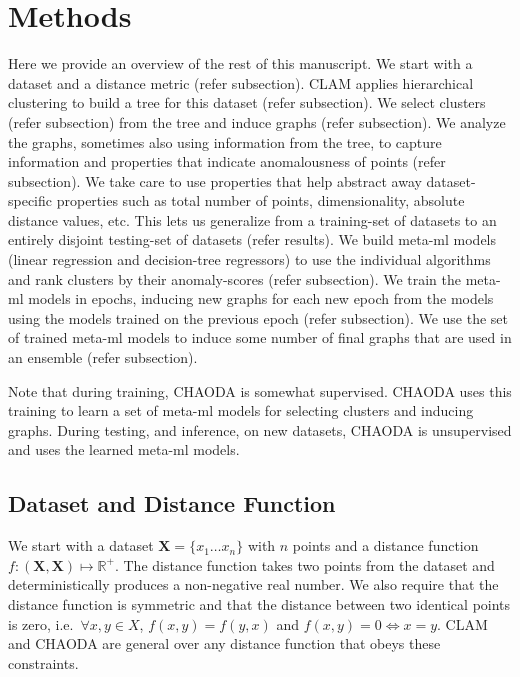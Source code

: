 \section{Methods}
\label{sec:methods}


Here we provide an overview of the rest of this manuscript.
We start with a dataset and a distance metric (refer subsection).
CLAM applies hierarchical clustering to build a tree for this dataset (refer subsection).
We select clusters (refer subsection) from the tree and induce graphs (refer subsection).
We analyze the graphs, sometimes also using information from the tree, to capture information and properties that indicate anomalousness of points (refer subsection).
We take care to use properties that help abstract away dataset-specific properties such as total number of points, dimensionality, absolute distance values, etc.
This lets us generalize from a training-set of datasets to an entirely disjoint testing-set of datasets (refer results).
We build meta-ml models (linear regression and decision-tree regressors) to use the individual algorithms and rank clusters by their anomaly-scores (refer subsection).
We train the meta-ml models in epochs, inducing new graphs for each new epoch from the models using the models trained on the previous epoch (refer subsection).
We use the set of trained meta-ml models to induce some number of final graphs that are used in an ensemble (refer subsection).

Note that during training, CHAODA is somewhat supervised.
CHAODA uses this training to learn a set of meta-ml models for selecting clusters and inducing graphs.
During testing, and inference, on new datasets, CHAODA is unsupervised and uses the learned meta-ml models.


\subsection{Dataset and Distance Function}
\label{subsec:methods:dataset-and-distance-function}

We start with a dataset $\textbf{X} = \{x_1 \dots x_n\}$ with $n$ points and a distance function $f : (\textbf{X}, \textbf{X}) \mapsto \mathbb{R}^+$.
The distance function takes two points from the dataset and deterministically produces a non-negative real number.
We also require that the distance function is symmetric and that the distance between two identical points is zero, i.e.\ $\forall x, y \in X$, $f(x, y) = f(y, x)$ and $f(x, y) = 0 \Leftrightarrow x = y$.
CLAM and CHAODA are general over any distance function that obeys these constraints.

